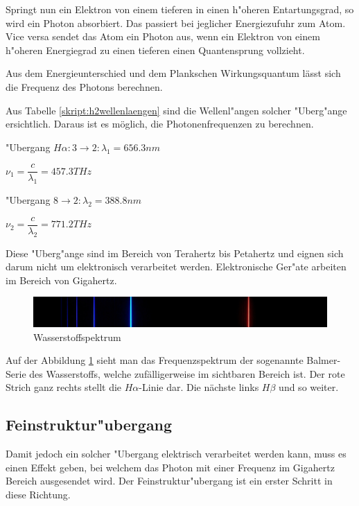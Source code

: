 \begin{refsection}
Springt nun ein Elektron von einem tieferen in einen h"oheren Entartungsgrad, so wird ein Photon absorbiert.
Das passiert bei jeglicher Energiezufuhr zum Atom. 
Vice versa sendet das Atom ein Photon aus, wenn ein Elektron von einem h"oheren Energiegrad zu einen tieferen einen Quantensprung vollzieht.

Aus dem Energieunterschied und dem Plankschen Wirkungsquantum lässt sich die Frequenz des Photons berechnen. %

Aus Tabelle \ref{skript:h2wellenlaengen} sind die Wellenl"angen solcher "Uberg"ange ersichtlich. Daraus ist es möglich, die Photonenfrequenzen zu berechnen.
\begin{center}
	"Ubergang $H\alpha: 3 \rightarrow 2: \lambda_1 = 656.3nm$

$\nu_1 = \dfrac{c}{\lambda_1} = 457.3 THz $
\vspace{.5cm}

"Ubergang $8 \rightarrow 2: \lambda_2 = 388.8nm$

$\nu_2 = \dfrac{c}{\lambda_2} = 771.2 THz$
\end{center}	

Diese "Uberg"ange sind im Bereich von Terahertz bis Petahertz und eignen sich darum nicht um elektronisch verarbeitet werden. Elektronische Ger"ate arbeiten im Bereich von Gigahertz.

\begin{figure}[h!]
	\centering
	\includegraphics[width = .6\columnwidth]{../vortrag/pictures/wasserstoffSpektrum.jpg}
	\caption{Wasserstoffspektrum} %
	\label{atomuhr:wasserstoffspektrum}
\end{figure}

Auf der Abbildung \ref{atomuhr:wasserstoffspektrum} sieht man das Frequenzspektrum der sogenannte Balmer-Serie des Wasserstoffs, welche zufälligerweise im sichtbaren Bereich ist. Der rote Strich ganz rechts stellt die $H\alpha$-Linie dar. Die nächste links $H\beta$ und so weiter.


\subsection{Feinstruktur"ubergang}
Damit jedoch ein solcher "Ubergang elektrisch verarbeitet werden kann, muss es einen Effekt geben, bei welchem das Photon mit einer Frequenz im Gigahertz Bereich ausgesendet wird. 
Der Feinstruktur"ubergang ist ein erster Schritt in diese Richtung. 


\end{refsection}
